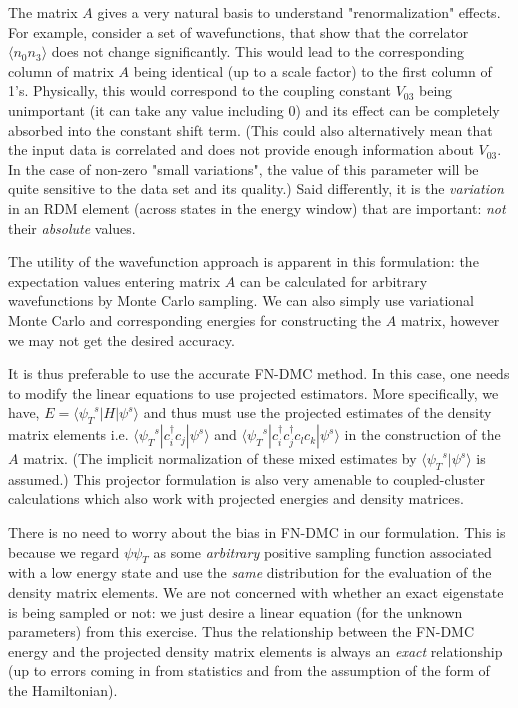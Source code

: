 \documentclass[aip,jcp,twocolumn,10pt]{revtex4-1}
\begin{document}
The matrix $A$ gives a very natural basis to understand "renormalization" effects.
For example, consider a set of wavefunctions, that show that the correlator 
$\langle n_0 n_3 \rangle$ does not change significantly. This would lead to the 
corresponding column of matrix $A$ being identical (up to a scale factor) 
to the first column of 1's. Physically, this would correspond to the coupling constant 
$V_{03}$ being unimportant (it can take any value including 0) and its 
effect can be completely absorbed into the constant shift term. 
(This could also alternatively mean that the input 
data is correlated and does not provide enough information about $V_{03}$. 
In the case of non-zero "small variations", the value of this parameter 
will be quite sensitive to the data set and its quality.) 
Said differently, it is the \emph{variation}  
in an RDM element (across states in the energy window) 
that are important: \emph{not} their \emph{absolute} values.

The utility of the wavefunction approach is apparent in this 
formulation: the expectation values entering matrix $A$ 
can be calculated for arbitrary wavefunctions by Monte Carlo sampling.
We can also simply use variational Monte Carlo and corresponding energies
for constructing the $A$ matrix, however we may not get the desired accuracy. 

It is thus preferable to use the accurate FN-DMC method. In this case, one needs to modify the linear equations 
to use projected estimators. More specifically, we have, $E= \langle {\psi_T}^{s}| H | {\psi}^s \rangle$ 
and thus must use the projected estimates of the density matrix elements i.e. 
$\langle {\psi_T}^s | c_i^{\dagger} c_j | {\psi}^s \rangle$ and $\langle {\psi_T}^s| c_i^{\dagger}c_j^{\dagger} c_l c_k | {\psi}^s \rangle$ 
in the construction of the $A$ matrix. (The implicit normalization of these 
mixed estimates by $\langle {\psi_T}^s | \psi^{s} \rangle$ is assumed.) 
This projector formulation is also very amenable to 
coupled-cluster calculations which also work with projected energies 
and density matrices.

There is no need to worry about the bias in FN-DMC in our formulation. 
This is because we regard $\psi \psi_T$ as some \emph{arbitrary} positive sampling function 
associated with a low energy state and use the \emph{same} distribution for the 
evaluation of the density matrix elements. We are not concerned with whether 
an exact eigenstate is being sampled or not: we just desire a linear equation 
(for the unknown parameters) from this exercise. Thus the relationship between the FN-DMC energy 
and the projected density matrix elements is always an \emph{exact} relationship 
(up to errors coming in from statistics and from the 
assumption of the form of the Hamiltonian). 
\end{document}
